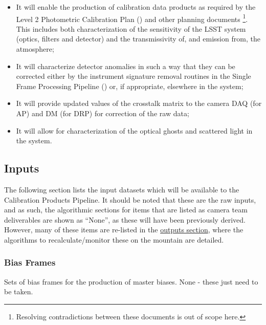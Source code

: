 \begin{itemize}
 \item It will enable the production of calibration data products as required by the Level 2 Photometric Calibration Plan (\NewPCP{}) and other planning documents \cite{Lupton15}\footnote{Resolving contradictions between these documents is out of scope here.}. This includes both characterization of the sensitivity of the LSST system (optics, filters and detector) and the transmissivity of, and emission from, the atmosphere;
 
 \item It will characterize detector anomalies in such a way that they can be corrected either by the instrument signature removal routines in the Single Frame Processing Pipeline (\wbsSFM) or, if appropriate, elsewhere in the system;
 
 \item It will provide updated values of the crosstalk matrix to the camera DAQ (for AP) and DM (for DRP) for correction of the raw data;
 
 \item It will allow for characterization of the optical ghosts and scattered light in the system.
\end{itemize}



\subsection{Inputs}
\label{sec:CPP:inputs} 
The following section lists the input datasets which will be available to the Calibration Products Pipeline. It should be noted that these are the raw inputs, and as such, the algorithmic sections for items that are listed as camera team deliverables are shown as ``None'', as these will have been previously derived. However, many of these items are re-listed in the \hyperref[sec:CPP:output]{outputs section}, where the algorithms to recalculate/monitor these on the mountain are detailed.

\subsubsection{Bias Frames}\label{sec:CPP:inputs:biases} 
Sets of bias frames for the production of master biases.
\alg None - these just need to be taken.



